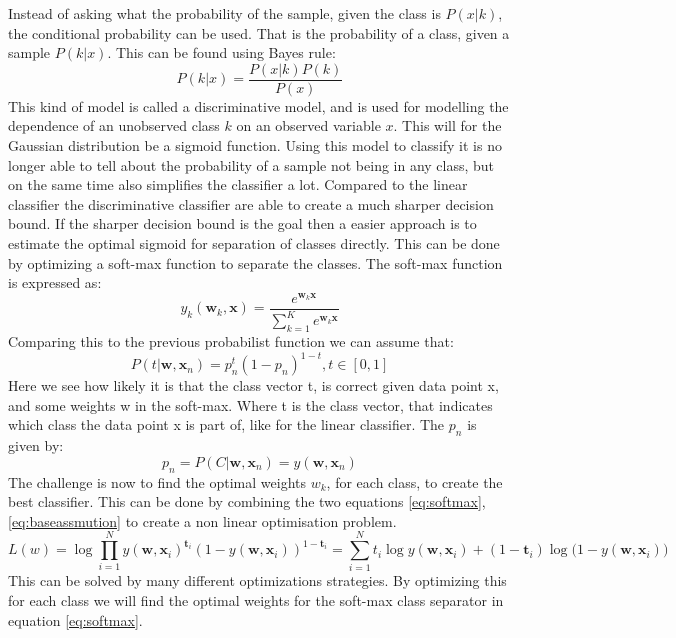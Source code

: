 Instead of asking what the probability of the sample, given the class is $P(x|k)$, the conditional probability can be used. That is the probability of a class, given a sample $P(k|x)$. This can be found using Bayes rule:
\begin{equation}
 P(k|x)=\frac{P(x|k)P(k)}{P(x)}
\end{equation}
This kind of model is called a discriminative model, and is used for modelling the dependence of an unobserved class $k$ on an observed variable $x$. This will for the Gaussian distribution be a sigmoid function. Using this model to classify it is no longer able to tell about the probability of a sample not being in any class, but on the same time also simplifies the classifier a lot. Compared to the linear classifier the discriminative classifier are able to create a much sharper decision bound. If the sharper decision bound is the goal then a easier approach is to estimate the optimal sigmoid for separation of classes directly. This can be done by optimizing a soft-max function to separate the classes. The soft-max function is expressed as: 
\begin{equation}
\label{eq:softmax}
 y_k(\textbf{w}_k,\textbf{x})=\frac{e^{\textbf{w}_k \textbf{x}}}{\sum\limits_{k=1}^K e^{\textbf{w}_k \textbf{x}}}
\end{equation}
Comparing this to the previous probabilist function we can assume that:
\begin{equation}
\label{eq:baseassmution}
 P(t|\textbf{w},\textbf{x}_n) = p_n^t (1-p_n)^{1-t} , t \in [0,1] 
\end{equation}
Here we see how likely it is that the class vector t, is correct given data point x, and some weights w in the soft-max.  Where t is the class vector, that indicates which class the data point x is part of, like for the linear classifier.  The $p_n$ is given by: 
\begin{equation}
 p_n = P(C| \textbf{w}, \textbf{x}_n) = y(\textbf{w},\textbf{x}_n)
\end{equation}
The challenge is now to find the optimal weights $w_k$, for each class, to create the best classifier. This can be done by combining the two equations \ref{eq:softmax}, \ref{eq:baseassmution} to create a non linear optimisation problem.
\begin{equation}
 L(w) = \log{\prod\limits_{i=1}^N y(\textbf{w},\textbf{x}_i)^{\textbf{t}_i} ( 1-y(\textbf{w},\textbf{x}_i))^{1-\textbf{t}_i}}
 = \sum\limits_{i=1}^N t_i\log{y(\textbf{w},\textbf{x}_i)}+(1-\textbf{t}_i)\log({1-y(\textbf{w},\textbf{x}_i))}
\end{equation}
This can be solved by many different optimizations strategies. By optimizing this for each class we will find the optimal weights for the soft-max class separator in equation \ref{eq:softmax}.\\

